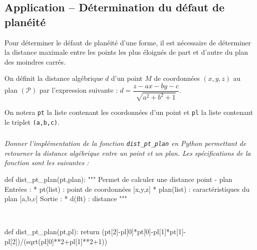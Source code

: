 \documentclass[10pt,fleqn]{article} %
\begin{document}
\subsection{Application -- Détermination du défaut de planéité}

\ifprof
\else

Pour déterminer le défaut de planéité d'une forme, il est nécessaire de déterminer la distance maximale entre les points les plus éloignés de part et d'autre du plan des moindres carrés.

On définit la distance algébrique $d$ d'un point $M$ de coordonnées $\left(x,y,z\right)$ au plan $\left( \mathcal{P}\right)$ par l'expression suivante :
$d = \dfrac{z - a x -b y -c}{\sqrt{a^2+b^2+1}}$.

On notera \texttt{pt} la liste contenant les coordonnées d'un point et \texttt{pl} la liste contenant le triplet \texttt{(a,b,c)}.

\fi 

\subparagraph{}
\textit{Donner l'implémentation de la fonction  \texttt{dist\_pt\_plan} en Python permettant de retourner la distance algébrique entre un point et un plan. Les spécifications de la fonction sont les suivantes :}
\begin{py}
\begin{python}
def dist_pt_plan(pt,plan):
    """
    Permet de calculer une distance point - plan
    Entrées : 
        * pt(list) : point de coordonnées [x,y,z]
        * plan(list) : caractéristiques du plan [a,b,c]
    Sortie : 
        * d(flt) : distance
    """
\end{python}
\end{py}
\ifprof
\begin{corrige}~\\
\begin{python}
def dist_pt_plan(pt,pl):
    return (pt[2]-pl[0]*pt[0]-pl[1]*pt[1]-pl[2])/(sqrt(pl[0]**2+pl[1]**2+1))
\end{python}
\end{corrige}
\else
\fi
\end{document}
